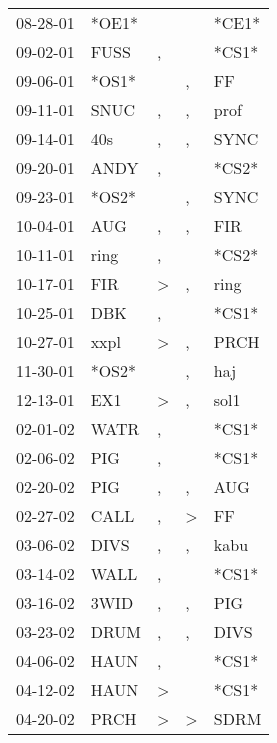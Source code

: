 \begin{supertabular}{lllll}
 08-28-01 &  *OE1* &               &               &  *CE1* \\
 09-02-01 &   FUSS &             , &               &  *CS1* \\
 09-06-01 &  *OS1* &               &             , &     FF \\
 09-11-01 &   SNUC &             , &             , &   prof \\
 09-14-01 &    40s &             , &             , &   SYNC \\
 09-20-01 &   ANDY &             , &               &  *CS2* \\
 09-23-01 &  *OS2* &               &             , &   SYNC \\
 10-04-01 &    AUG &             , &             , &    FIR \\
 10-11-01 &   ring &             , &               &  *CS2* \\
 10-17-01 &    FIR &  \textgreater &             , &   ring \\
 10-25-01 &    DBK &             , &               &  *CS1* \\
 10-27-01 &   xxpl &  \textgreater &             , &   PRCH \\
 11-30-01 &  *OS2* &               &             , &    haj \\
 12-13-01 &    EX1 &  \textgreater &             , &   sol1 \\
 02-01-02 &   WATR &             , &               &  *CS1* \\
 02-06-02 &    PIG &             , &               &  *CS1* \\
 02-20-02 &    PIG &             , &             , &    AUG \\
 02-27-02 &   CALL &             , &  \textgreater &     FF \\
 03-06-02 &   DIVS &             , &             , &   kabu \\
 03-14-02 &   WALL &             , &               &  *CS1* \\
 03-16-02 &   3WID &             , &             , &    PIG \\
 03-23-02 &   DRUM &             , &             , &   DIVS \\
 04-06-02 &   HAUN &             , &               &  *CS1* \\
 04-12-02 &   HAUN &  \textgreater &               &  *CS1* \\
 04-20-02 &   PRCH &  \textgreater &  \textgreater &   SDRM \\

\end{supertabular}
